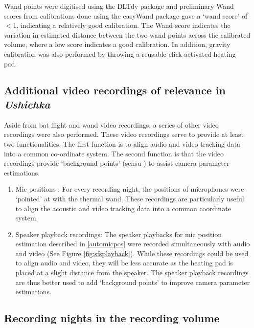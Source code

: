 \documentclass[
]{book}
\begin{document}
Wand points were digitised using the DLTdv package \citep{dltdv} and preliminary Wand scores from calibrations done using the easyWand package\cite{Theriault2014} gave a `wand score' of \(< 1\), indicating a relatively good calibration. The Wand score indicates the variation in estimated distance between the two wand points across the calibrated volume, where a low score indicates a good calibration. In addition, gravity calibration was also performed by throwing a reusable click-activated heating pad.

\hypertarget{additional-video-recordings-of-relevance-in-ushichka}{%
\subsection{\texorpdfstring{Additional video recordings of relevance in \emph{Ushichka}}{Additional video recordings of relevance in Ushichka}}\label{additional-video-recordings-of-relevance-in-ushichka}}

Aside from bat flight and wand video recordings, a series of other video recordings were also performed. These video recordings serve to provide at least two functionalities. The first function is to align audio and video tracking data into a common co-ordinate system. The second function is that the video recordings provide `background points' (sensu \citet{Theriault2014}) to assist camera parameter estimations.

\begin{enumerate}
\def\labelenumi{\arabic{enumi}.}
\item
  Mic positions : For every recording night, the positions of microphones were `pointed' at with the thermal wand. These recordings are particularly useful to align the acoustic and video tracking data into a common coordinate system.
\item
  Speaker playback recordings: The speaker playbacks for mic position estimation described in \ref{automicpos} were recorded simultaneously with audio and video (See Figure \ref{fig:sfsplayback}). While these recordings could be used to align audio and video, they will be less accurate as the heating pad is placed at a slight distance from the speaker. The speaker playback recordings are thus better used to add `background points' to improve camera parameter estimations.
\end{enumerate}

\hypertarget{recnights}{%
\subsection{Recording nights in the recording volume}\label{recnights}}
\end{document}
